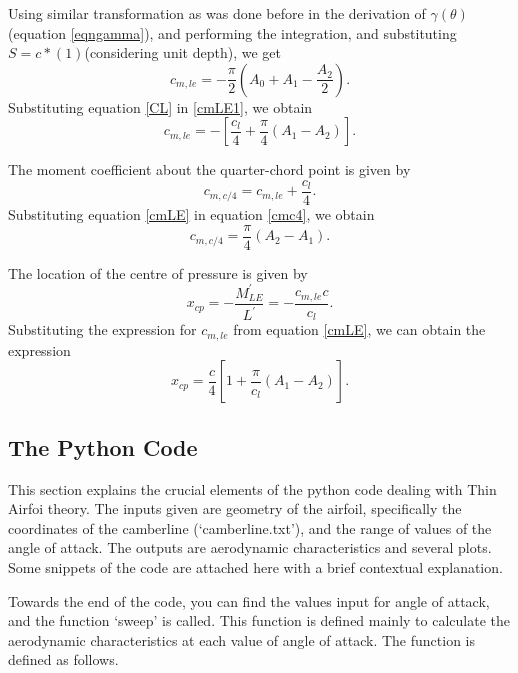 \documentclass[letterpaper,12pt]{article}
\begin{document}
Using similar transformation as was done before in the derivation of $\gamma(\theta)$ (equation \ref{eqngamma}), and performing the integration, and substituting $S = c * (1)$(considering unit depth), we get
\begin{equation}
c_{m,le} = -\frac{\pi}{2}\left(A_0+A_1-\frac{A_2}{2}\right).
\label{cmLE1}
\end{equation}
Substituting equation \ref{CL} in \ref{cmLE1}, we obtain
\begin{equation}
c_{m,le} = -\left[\frac{c_l}{4}+\frac{\pi}{4}(A_1-A_2)\right].
\label{cmLE}
\end{equation}

The moment coefficient about the quarter-chord point is given by
\begin{equation}
c_{m,c/4} = c_{m,le}+\frac{c_l}{4}.
\label{cmc4}
\end{equation}
Substituting equation \ref{cmLE} in equation \ref{cmc4}, we obtain
\begin{equation}
\boxed{
c_{m,c/4} = \frac{\pi}{4}(A_2-A_1).
}
\end{equation}

The location of the centre of pressure is given by
\begin{equation}
x_{cp} = -\frac{M_{LE}^{'}}{L^{'}} = -\frac{c_{m,le}c}{c_l}.
\end{equation}
Substituting the expression for $c_{m,le}$ from equation \ref{cmLE}, we can obtain the expression
\begin{equation}
\boxed{
x_{cp} = \frac{c}{4}\left[1+\frac{\pi}{c_l}(A_1-A_2)\right].
}
\end{equation}

\subsection{The Python Code}

\lstset{inputpath=./thin_airfoil/}
This section explains the crucial elements of the python code dealing with Thin Airfoi theory. The inputs given are geometry of the airfoil, specifically the coordinates of the camberline (`camberline.txt'), and the range of values of the angle of attack. The outputs are aerodynamic characteristics and several plots. Some snippets of the code are attached here with a brief contextual explanation. 



Towards the end of the code, you can find the values input for angle of attack, and the function `sweep' is called. This function is defined mainly to calculate the aerodynamic characteristics at each value of angle of attack. The function is defined as follows.
\end{document}
